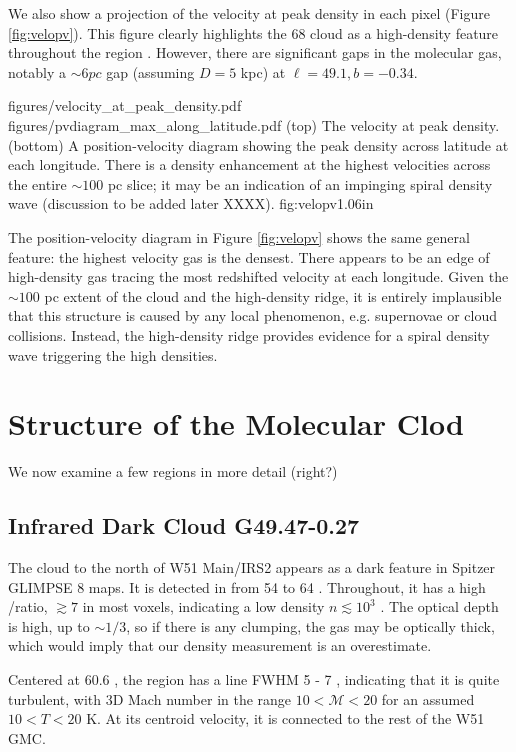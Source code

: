 We also show a projection of the velocity at peak density in each pixel (Figure
\ref{fig:velopv}).  This figure clearly highlights the 68 \kms cloud as a
high-density feature throughout the region \citep{Carpenter1998a}.  However,
there are significant gaps in the molecular gas, notably a $\sim6 pc$ gap
(assuming $D=5$ kpc) at $\ell=49.1, b=-0.34$.

\FigureTwoAA
{figures/velocity_at_peak_density.pdf}
{figures/pvdiagram_max_along_latitude.pdf}
{(top) The velocity at peak density.
 (bottom) A position-velocity diagram showing the peak density across latitude
 at each longitude.  There is a density enhancement at the highest velocities
 across the entire $\sim100$ pc slice; it may be an indication of an impinging 
 spiral density wave (discussion to be added later XXXX).
}
{fig:velopv}{1.0}{6in}

The position-velocity diagram in Figure \ref{fig:velopv} shows the same general
feature: the highest velocity gas is the densest.  There appears to be an edge
of high-density gas tracing the most redshifted velocity at each longitude.
Given the $\sim100$ pc extent of the cloud and the high-density ridge, it is
entirely implausible that this structure is caused by any local phenomenon,
e.g. supernovae or cloud collisions.  Instead, the high-density ridge provides
evidence for a spiral density wave triggering the high densities.

\section{Structure of the Molecular Clod}
We now examine a few regions in more detail (right?)

\subsection{Infrared Dark Cloud G49.47-0.27}
The cloud to the north of W51 Main/IRS2 appears as a dark feature in Spitzer
GLIMPSE 8 \um maps.  It is detected in \formaldehyde from 54 to 64
\kms.  Throughout, it has a high \oneone/\twotwo ratio, $\gtrsim7$ in
most voxels, indicating a low density $n\lesssim10^3$ \percc.  The \oneone
optical depth is high, up to $\sim1/3$, so if there is any clumping, the gas
may be optically thick, which would imply that our density measurement is an
overestimate.

Centered at 60.6 \kms, the region has a line FWHM 5 - 7 \kms, indicating that
it is quite turbulent, with 3D Mach number in the range $10 < \mathcal{M} < 20$
for an assumed $10 < T < 20$ K.  At its centroid velocity, it is connected
to the rest of the W51 GMC.


